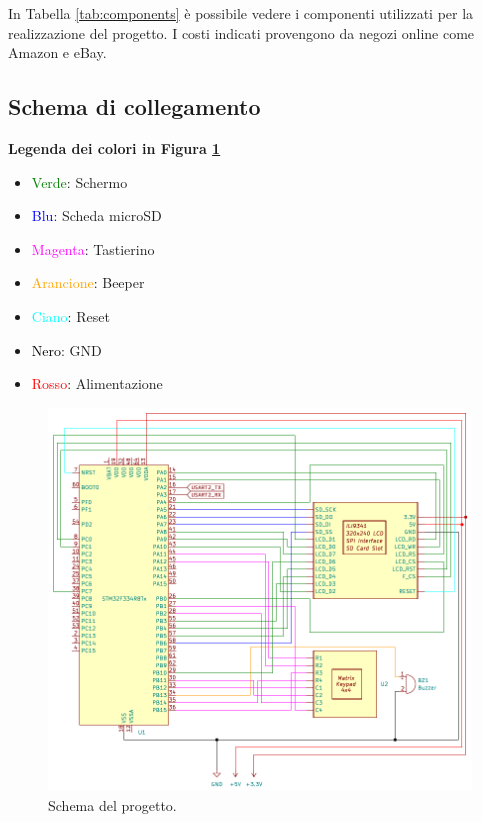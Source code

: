 \documentclass[a4paper]{article}
\begin{document}
In Tabella \ref{tab:components} è possibile vedere i componenti utilizzati per la
realizzazione del progetto. I costi indicati provengono da negozi online come Amazon e eBay.

\subsection{Schema di collegamento}

\textbf{Legenda dei colori in Figura \ref{fig:schema}}

\begin{multicols}{2}
\begin{itemize}
    \item \textcolor{green}{Verde}: Schermo
    \item \textcolor{blue}{Blu}: Scheda microSD
    \item \textcolor{magenta}{Magenta}: Tastierino
    \item \textcolor{orange}{Arancione}: Beeper
    \item \textcolor{cyan}{Ciano}: Reset
    \item \textcolor{black}{Nero}: GND
    \item \textcolor{red}{Rosso}: Alimentazione
\end{itemize}
\end{multicols}

\begin{figure}[h!t]
    \begin{center}
        \includegraphics[scale=1]{figures/STM32_CHIP8.pdf}
    \end{center}
    \caption{
        Schema del progetto.
    }
    \label{fig:schema}
\end{figure}
\end{document}
